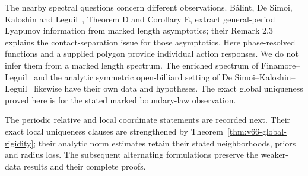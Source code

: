The nearby spectral questions concern different observations.
B\'alint, De Simoi, Kaloshin and Leguil~\cite{BDKL}, Theorem D and
Corollary E, extract general-period Lyapunov information from marked
length asymptotics; their Remark 2.3 explains the contact-separation
issue for those asymptotics.  Here phase-resolved functions and a supplied
polygon provide individual action responses.  We do not infer them from
a marked length spectrum.  The enriched spectrum of
Finamore--Leguil~\cite{FinamoreLeguil} and the analytic symmetric
open-billiard setting of De Simoi--Kaloshin--Leguil~\cite{DSKL} likewise
have their own data and hypotheses.  The exact global uniqueness proved
here is for the stated marked boundary-law observation.

The periodic relative and local coordinate statements are recorded next.
Their exact local uniqueness clauses are strengthened by
Theorem~\ref{thm:v66-global-rigidity}; their analytic norm estimates retain
their stated neighborhoods, priors and radius loss.  The subsequent
alternating formulations preserve the weaker-data results and their
complete proofs.
